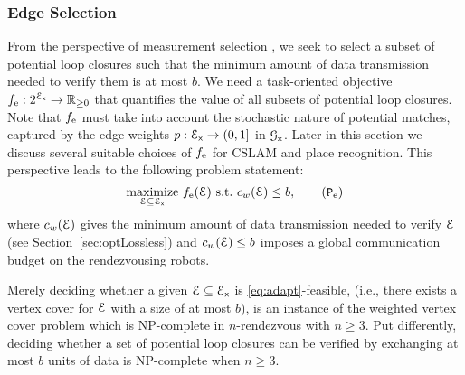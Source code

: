 \documentclass[conference]{IEEEtran}
\begin{document}
\subsubsection{Edge Selection} From the perspective of measurement selection \cite{kasra16wafr,kasra18ijrr,carlone2017attention}, 
we seek to select a subset of potential loop closures such that the minimum
amount of data transmission needed to verify them is at most $b$.
We need a task-oriented objective $f_\text{e}: 2^{\mathcal{E}_\mathsf{x}} \to \mathbb{R}_{\geq 0}$ that quantifies the value
of all subsets of potential loop closures. Note that $f_\text{e}$ must take into account
the stochastic nature of potential matches, captured by the edge weights $p :
\mathcal{E}_\mathsf{x} \to (0,1]$ in $\mathcal{G}_\mathsf{x}$. Later in this
section we discuss several suitable choices of $f_\text{e}$ for CSLAM and place
recognition. 
This perspective leads to the following problem statement:
\begin{equation}
\underset{\Lcal \subseteq \Eall}{\mathrm{maximize }}
\,\, \fe(\Lcal) \,\,\mathrm{s.t.}\,\,
\vcover(\Lcal) \leq b,
\label{eq:adapt}
\tag{$\mathtt{P}_\text{e}$}
\end{equation}
where $c_w(\mathcal{E})$ gives the minimum amount of data transmission needed to
verify $\mathcal{E}$ (see Section~\ref{sec:optLossless}) and $c_w(\mathcal{E}) \leq b$ imposes a
global communication budget on the rendezvousing robots.
\begin{remark}
  \label{rem:npcomplete}
  Merely deciding whether a given $\mathcal{E} \subseteq \mathcal{E}_\mathsf{x}$ is \ref{eq:adapt}-feasible,
  (i.e., there exists a vertex cover for $\mathcal{E}$ with a size of at most
  $b$), is an instance of the weighted vertex cover problem
  which is NP-complete \cite{karp1972reducibility} in $n$-rendezvous with
  $n \geq 3$.
  Put differently, deciding whether a set of potential loop closures can be
  verified by exchanging at most $b$ units of data is NP-complete when $n \geq 3$.
\end{remark}
\end{document}
